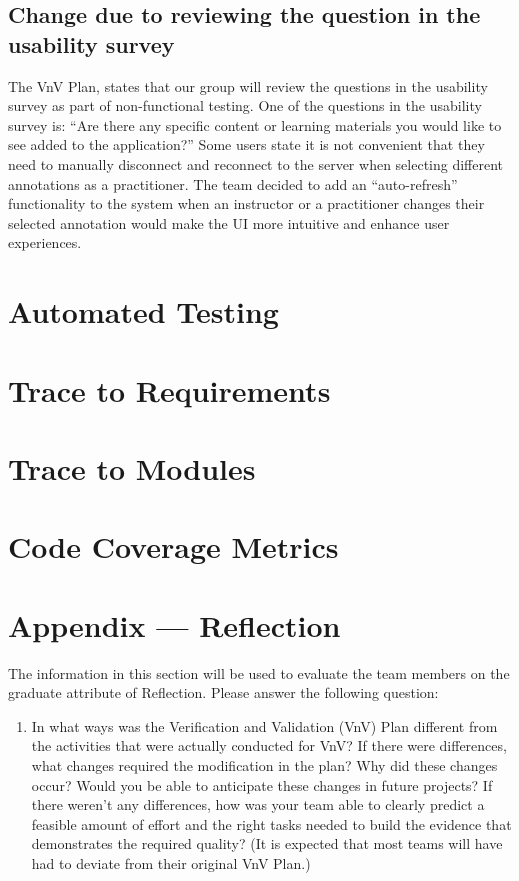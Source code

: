 \documentclass[12pt, titlepage]{article}
\begin{document}
\subsection{Change due to reviewing the question in the usability survey}
The VnV Plan, states that our group will review the questions in the usability survey as part of non-functional testing. One of the questions in the usability survey is: “Are there any specific content or learning materials you would like to see added to the application?” Some users state it is not convenient that they need to manually disconnect and reconnect to the server when selecting different annotations as a practitioner. The team decided to add an “auto-refresh” functionality to the system when an instructor or a practitioner changes their selected annotation would make the UI more intuitive and enhance user experiences.

\section{Automated Testing}
		
\section{Trace to Requirements}
		
\section{Trace to Modules}		

\section{Code Coverage Metrics}




\newpage{}
\section*{Appendix --- Reflection}

The information in this section will be used to evaluate the team members on the
graduate attribute of Reflection.  Please answer the following question:

\begin{enumerate}
  \item In what ways was the Verification and Validation (VnV) Plan different
  from the activities that were actually conducted for VnV?  If there were
  differences, what changes required the modification in the plan?  Why did
  these changes occur?  Would you be able to anticipate these changes in future
  projects?  If there weren't any differences, how was your team able to clearly
  predict a feasible amount of effort and the right tasks needed to build the
  evidence that demonstrates the required quality?  (It is expected that most
  teams will have had to deviate from their original VnV Plan.)
\end{enumerate}
\end{document}

